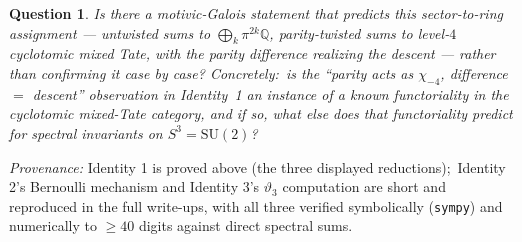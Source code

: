 \documentclass[11pt]{article}
\newtheorem{question}{Question}
\newcommand{\Q}{\mathbb{Q}}
\begin{document}
\begin{question}
Is there a motivic-Galois statement that \emph{predicts} this
sector-to-ring assignment --- untwisted sums to
$\bigoplus_k \pi^{2k}\Q$, parity-twisted sums to level-$4$
cyclotomic mixed Tate, with the parity difference realizing the
descent --- rather than confirming it case by case? Concretely:\ is
the ``parity acts as $\chi_{-4}$, difference $=$ descent''
observation in Identity~1 an instance of a known functoriality in
the cyclotomic mixed-Tate category, and if so, what else does that
functoriality predict for spectral invariants on
$S^3 = \mathrm{SU}(2)$?
\end{question}

\noindent\emph{Provenance:} Identity 1 is proved above (the three
displayed reductions);\ Identity 2's Bernoulli mechanism and
Identity 3's $\vartheta_3$ computation are short and reproduced in
the full write-ups, with all three verified symbolically
(\texttt{sympy}) and numerically to $\ge 40$ digits against direct
spectral sums.
\end{document}
